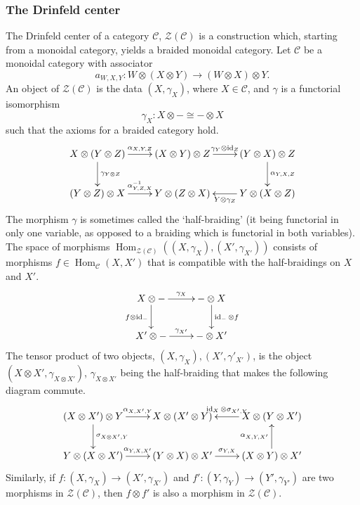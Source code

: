 \documentclass[11pt]{book}
\theoremstyle{Rem}
\theoremstyle{definition}
\numberwithin{equation}{section}
\newcommand\inv{^{-1}}
\newcommand\id{\operatorname{id}}
\newcommand\ot{\otimes}
\newcommand\Hom{\operatorname{Hom}}
\newcommand\C{\mathcal C}
\newcommand\CTR{\mathcal Z}
\begin{document}
\subsubsection{The Drinfeld center}
The Drinfeld center of a category $\C$, $\CTR(\C)$ is a construction which, starting from a monoidal category, yields a braided monoidal category. Let $\C$ be a monoidal category with associator \begin{equation}
	a_{W, X, Y}: W\otimes (X \otimes Y) \rightarrow (W\otimes X) \otimes Y. 
\end{equation}
An object of $\CTR(\C)$ is the data $(X, \gamma_X)$, where $X\in \C$, and $\gamma$ is a functorial isomorphism \begin{equation}
	\gamma_X: X\otimes - \cong -\otimes X
\end{equation} such that the axioms for a braided category hold. 
 \begin{align} 
\xymatrix { X\ot (Y \ot Z) \ar[r]^{\alpha_{X, Y, Z}}\ar[d]^{\gamma_{Y\ot Z}} & (X\ot Y) \ot Z \ar[r]^{\gamma_Y\ot \id_Z} & (Y\ot X)\ot Z \ar[d]^{\alpha_{Y, X, Z}} \\
(Y\ot Z)\ot X \ar[r]^{\alpha\inv_{Y, Z, X}} & Y\ot (Z \ot X) & Y\ot (X \ot Z)\ar[l]^{Y\ot \gamma_Z}\\}
\end{align}
The morphism $\gamma$ is sometimes called the `half-braiding' (it being functorial in only one variable, as opposed to a braiding which is functorial in both variables).
The space of morphisms $\Hom_{\CTR(\C)}((X, \gamma_X), (X', \gamma_{X'}))$ consists of morphisms $f\in \Hom_\C(X, X')$ that is compatible with the half-braidings on $X$ and $X'$.
\begin{equation}
 	\xymatrix{X\otimes - \ar[r]^{\gamma_X} \ar[d]_{f\otimes \id_-} & - \otimes X \ar[d]^{\id_- \otimes f} \\
 	 	X'\otimes - \ar[r]^{\gamma_{X'}} &-\otimes X' }
 \end{equation}
 The tensor product of two objects, $(X, \gamma_X), (X', \gamma'_{X'})$, is the object $(X\otimes X', \gamma_{X\ot X'})$, $\gamma_{X\ot X'}$ being the half-braiding that makes the following diagram commute. \begin{equation}
 	 \xymatrix{(X\otimes X') \otimes Y \ar[r]^{\alpha_{X, X', Y}} \ar[d]^{\sigma_{X\ot X', Y}} & X\otimes (X' \otimes Y)& X\otimes (Y \otimes X') \ar[l]_{\id_X \ot \sigma_{X', Y}} \\
 	  Y\otimes (X \otimes X') \ar[r]^{\alpha_{Y, X, X'}} &  (Y\otimes X)\otimes X'\ar[r]^{\sigma_{Y, X}} & (X \otimes Y) \otimes X' \ar[u]^{\alpha_{X, Y, X'}}  }
 \end{equation}
 Similarly, if $f:(X, \gamma_X)\rightarrow (X', \gamma_{X'})$ and $f': (Y, \gamma_Y) \rightarrow (Y', \gamma_{Y'})$ are two morphisms in $\CTR(\C)$, then $f\otimes f'$ is also a morphism in $\CTR(\C)$.
\end{document}
